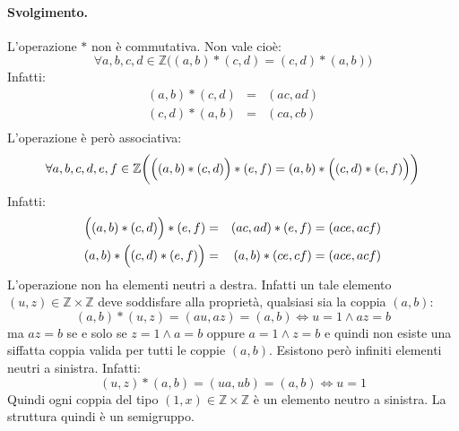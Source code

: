 \paragraph*{Svolgimento.} L'operazione $\ast$ non è commutativa. Non vale cioè:
\begin{displaymath}
	\forall a,b,c,d \in \mathbb{Z} \bigl((a,b) \ast (c,d) = (c,d) \ast (a,b) \bigr)
\end{displaymath}
Infatti:
\begin{eqnarray*}
	(a,b) \ast (c,d) &=& (ac,ad) \\
	(c,d) \ast (a,b) &=& (ca,cb) \\
\end{eqnarray*}
L'operazione è però associativa:
\begin{displaymath}
	\forall a,b,c,d,e,f \in \mathbb{Z} \biggl( \Bigl((a,b)\ast(c,d)\Bigr)\ast (e,f)=  (a,b)\ast \Bigl((c,d)\ast (e,f)\Bigr)\biggr)
\end{displaymath}
Infatti:
\begin{eqnarray*}
	\Bigl((a,b)\ast(c,d)\Bigr)\ast (e,f) &=& (ac,ad) \ast (e,f) = (ace,acf) \\
	(a,b)\ast \Bigl((c,d)\ast (e,f)\Bigr) &=& (a,b) \ast (ce,cf) =(ace,acf)
\end{eqnarray*}
L'operazione non ha elementi neutri a destra. Infatti un tale elemento $(u,z)\in \mathbb{Z}\times \mathbb{Z}$ deve soddisfare alla proprietà, qualsiasi sia la coppia $(a,b)$:
\begin{displaymath}
	(a,b) \ast (u,z)= (au,az)=(a,b) \iff u=1 \wedge az=b
\end{displaymath}
ma $az=b$ se e solo se $z= 1 \wedge a=b$ oppure $a=1 \wedge z=b$ e quindi non esiste una siffatta coppia valida per tutti le coppie $(a,b)$. Esistono però infiniti elementi neutri a sinistra. Infatti:
\begin{displaymath}
	(u,z) \ast (a,b) = (ua,ub) = (a,b) \iff u=1
\end{displaymath}
Quindi ogni coppia del tipo $(1,x)\in \mathbb{Z}\times \mathbb{Z}$ è un elemento neutro a sinistra. La struttura quindi è un semigruppo. \hfill \blacksquare
